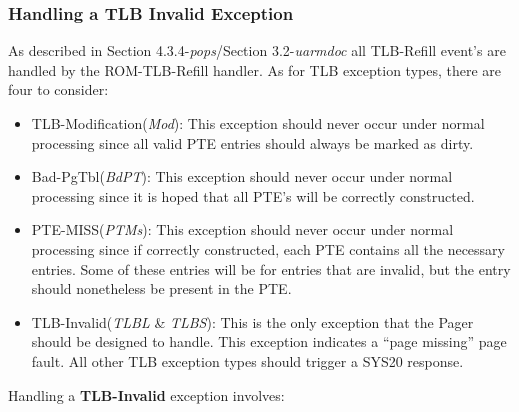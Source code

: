\subsubsection{Handling a TLB Invalid Exception}\label{ssec:tlbinv}
As described in Section 4.3.4-\emph{pops}/Section 3.2-\emph{uarmdoc} all TLB-Refill event's are handled by the ROM-TLB-Refill handler. As for TLB exception types, there are four to consider:
\begin{itemize}
\item TLB-Modification(\emph{Mod}): This exception should never occur under normal processing since all valid PTE entries should always be marked as dirty.
\item Bad-PgTbl(\emph{BdPT}): This exception should never occur under normal processing since it is hoped that all PTE's will be correctly constructed.
\item  PTE-MISS(\emph{PTMs}): This exception should never occur under normal processing since if correctly constructed, each PTE contains all the necessary entries. Some of these entries will be for entries that are invalid, but the entry should nonetheless be present in the PTE.
\item TLB-Invalid(\emph{TLBL} \& \emph{TLBS}): This is the only exception that the Pager should be designed to handle.
This exception indicates a ``page missing'' page fault.
All other TLB exception types should trigger a SYS20 response.
\end{itemize}
Handling a \textbf{TLB-Invalid} exception involves:

